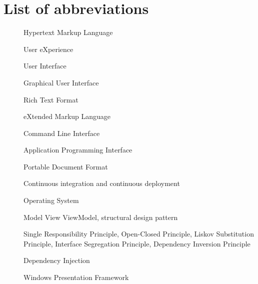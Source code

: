 \chapter*{List of abbreviations}

\begin{multicols}{2}
    \raggedright
    \begin{description}
        \item [] Hypertext Markup Language
        \item [] User eXperience
        \item [] User Interface
        \item [] Graphical User Interface
        \item [] Rich Text Format
        \item [] eXtended Markup Language
        \item [] Command Line Interface
        \item [] Application Programming Interface
        \item [] Portable Document Format
        \item [] Continuous integration and continuous deployment
        \item [] Operating System
        \item [] Model View ViewModel, structural design pattern
        \item [] Single Responsibility Principle, Open-Closed Principle, Liskov Substitution Principle, Interface Segregation Principle, Dependency Inversion Principle
        \item [] Dependency Injection
        \item [] Windows Presentation Framework
    \end{description}
\end{multicols}

